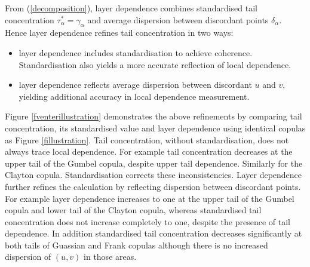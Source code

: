 \documentclass[authoryear]{elsarticle}
\newcommand{\eref}[1]{(\ref{#1})}
\newcommand{\fref}[1]{Figure \ref{#1}}
\begin{document}
From \eref{decomposition}, layer dependence combines standardised tail concentration $\tau_\alpha^*=\gamma_\alpha$ and average dispersion between discordant points $\delta_\alpha$. Hence layer dependence refines tail concentration in two ways:
\begin{itemize}

\item layer dependence includes standardisation to achieve coherence. Standardisation also yields a more accurate reflection of local dependence.

\item layer dependence reflects average dispersion between discordant $u$ and $v$, yielding additional accuracy in local dependence measurement.
\end{itemize}
\fref{fventerillustration} demonstrates the above refinements by comparing tail concentration, its standardised value and layer dependence using identical copulas as \fref{fillustration}. Tail concentration, without standardisation, does not always trace local dependence. For example tail concentration decreases at the upper tail of the Gumbel copula, despite upper tail dependence. Similarly for the Clayton copula. Standardisation corrects these inconsistencies. Layer dependence further refines the calculation by reflecting dispersion between discordant points. For example layer dependence increases to one at the upper tail of the Gumbel copula and lower tail of the Clayton copula, whereas standardised tail concentration does not increase completely to one, despite the presence of tail dependence. In addition standardised tail concentration decreases significantly at both tails of Guassian and Frank copulas although there is no increased dispersion of $(u,v)$ in those areas.
\end{document}
